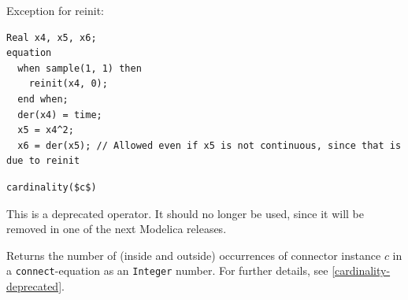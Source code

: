 \begin{operatordefinition}[der]
\begin{semantics}
\begin{example}
Exception for reinit:
\begin{lstlisting}[language=modelica]
  Real x4, x5, x6;
equation
  when sample(1, 1) then
    reinit(x4, 0);
  end when;
  der(x4) = time;
  x5 = x4^2;
  x6 = der(x5); // Allowed even if x5 is not continuous, since that is due to reinit
\end{lstlisting}
\end{example}

\end{semantics}
\end{operatordefinition}

\begin{operatordefinition}[cardinality]
\begin{synopsis}\begin{lstlisting}
cardinality($c$)
\end{lstlisting}\end{synopsis}
\begin{semantics}
\begin{nonnormative}
This is a deprecated operator.
It should no longer be used, since it will be removed in one of the next Modelica releases.
\end{nonnormative}
Returns the number of (inside and outside) occurrences of connector instance $c$ in a \lstinline!connect!-equation as an \lstinline!Integer! number.
For further details, see \cref{cardinality-deprecated}.
\end{semantics}
\end{operatordefinition}

